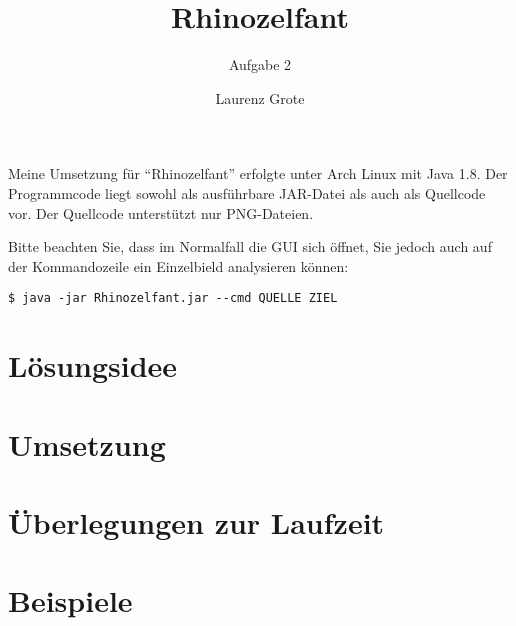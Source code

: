 \documentclass[parskip=full, DIV=14]{scrartcl}
\newcommand{\shellcmd}[1]{\texttt{\$ #1}\\}
\begin{document}
	\titlehead{35. Bundeswettbewerb Informatik \hfill Team 00001, Teilnahme 6745}
	\title{Rhinozelfant}
	\subtitle{Aufgabe 2}
	\author{Laurenz Grote}
	\date{}
	\maketitle
	\tableofcontents
	
	\vspace {3em}

	Meine Umsetzung für "`Rhinozelfant"' erfolgte unter Arch Linux mit Java 1.8. Der Programmcode liegt sowohl als ausführbare JAR-Datei als auch als Quellcode vor. Der Quellcode unterstützt nur PNG-Dateien.

	Bitte beachten Sie, dass im Normalfall die GUI sich öffnet, Sie jedoch auch auf der Kommandozeile ein Einzelbield analysieren können:

	\shellcmd{java -jar Rhinozelfant.jar -{}-cmd QUELLE ZIEL}

	\clearpage
	\section{Lösungsidee}
		
	\clearpage
	\section{Umsetzung}
		
	\clearpage
	\section{Überlegungen zur Laufzeit}
		
	\clearpage
	\section{Beispiele}
		
\end{document}
